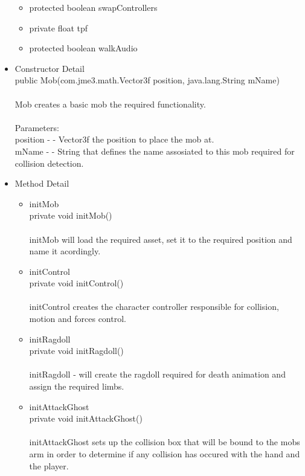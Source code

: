 \documentclass[letterpaper]{article}
\begin{document}
\begin{itemize}
\begin{itemize}
											\item	protected boolean	swapControllers 
											\item	private float	tpf 
											\item	protected boolean	walkAudio 
										\end{itemize}
								\item	Constructor Detail \\
										public Mob(com.jme3.math.Vector3f position, java.lang.String mName) \\ \\ 
										Mob creates a basic mob the required functionality. \\ \\
										Parameters: \\
										position - - Vector3f the position to place the mob at. \\
										mName - - String that defines the name assosiated to this mob required for collision detection.
								\item	Method Detail
										\begin{itemize}
											\item	initMob \\
													private void initMob() \\ \\
													initMob will load the required asset, set it to the required position and name it acordingly. \\ 
											\item	initControl \\
													private void initControl() \\ \\
													initControl creates the character controller responsible for collision, motion and forces control.
											\item	initRagdoll \\
													private void initRagdoll() \\ \\
													initRagdoll - will create the ragdoll required for death animation and assign the required limbs.
											\item	initAttackGhost \\
													private void initAttackGhost() \\ \\
													initAttackGhost sets up the collision box that will be bound to the mobs arm in order to determine if any collision has occured with the hand and the player.

\end{itemize}
\end{itemize}
\end{document}
